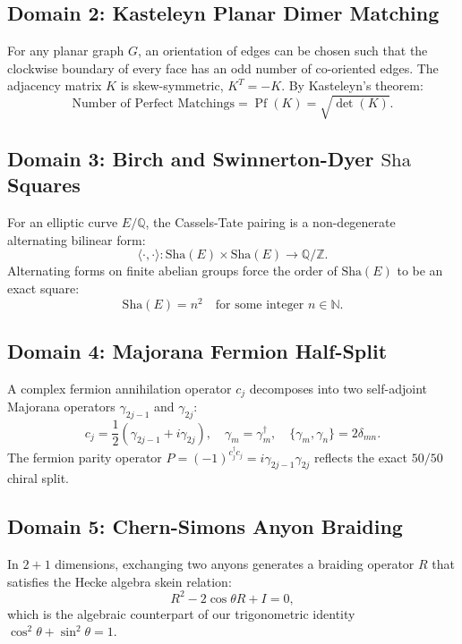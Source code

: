 \documentclass[11pt,a4paper]{article}
\providecommand{\Sha}{\mathrm{Sha}}
\theoremstyle{definition}
\begin{document}
\subsection{Domain 2: Kasteleyn Planar Dimer Matching}
For any planar graph $G$, an orientation of edges can be chosen such that the clockwise boundary of every face has an odd number of co-oriented edges. The adjacency matrix $K$ is skew-symmetric, $K^T = -K$. By Kasteleyn's theorem:
\begin{equation}
\text{Number of Perfect Matchings} = \operatorname{Pf}(K) = \sqrt{\det(K)}.
\end{equation}

\subsection{Domain 3: Birch and Swinnerton-Dyer $\Sha$ Squares}
For an elliptic curve $E/\mathbb{Q}$, the Cassels-Tate pairing is a non-degenerate alternating bilinear form:
\begin{equation}
\langle \cdot, \cdot \rangle : \Sha(E) \times \Sha(E) \to \mathbb{Q}/\mathbb{Z}.
\end{equation}
Alternating forms on finite abelian groups force the order of $\Sha(E)$ to be an exact square:
\begin{equation}
\Sha(E) = n^2 \quad \text{for some integer } n \in \mathbb{N}.
\end{equation}

\subsection{Domain 4: Majorana Fermion Half-Split}
A complex fermion annihilation operator $c_j$ decomposes into two self-adjoint Majorana operators $\gamma_{2j-1}$ and $\gamma_{2j}$:
\begin{equation}
c_j = \frac{1}{2}(\gamma_{2j-1} + i\gamma_{2j}), \quad \gamma_m = \gamma_m^\dagger, \quad \{\gamma_m, \gamma_n\} = 2\delta_{mn}.
\end{equation}
The fermion parity operator $P = (-1)^{c_j^\dagger c_j} = i \gamma_{2j-1} \gamma_{2j}$ reflects the exact $50/50$ chiral split.

\subsection{Domain 5: Chern-Simons Anyon Braiding}
In $2+1$ dimensions, exchanging two anyons generates a braiding operator $R$ that satisfies the Hecke algebra skein relation:
\begin{equation}
R^2 - 2\cos\theta R + I = 0,
\end{equation}
which is the algebraic counterpart of our trigonometric identity $\cos^2\theta + \sin^2\theta = 1$.
\end{document}
